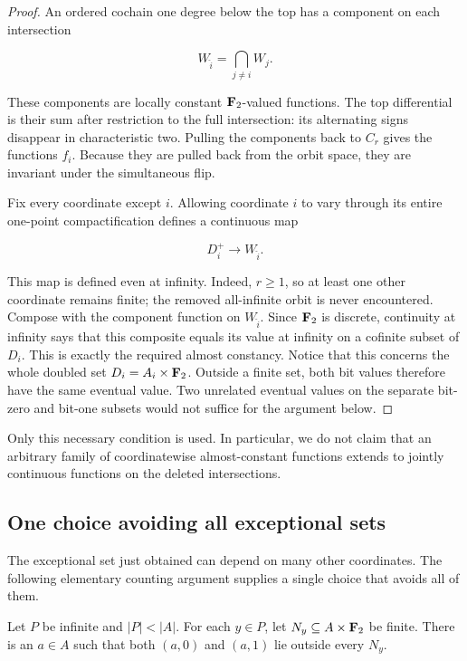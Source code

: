 \begin{proof}
An ordered cochain one degree below the top has a component on each
intersection

\[
W_{\widehat i}=\bigcap_{j\neq i}W_j.
\]

These components are locally constant \(\mathbf F_2\)-valued functions.
The top differential is their sum after restriction to the full
intersection: its alternating signs disappear in characteristic two.
Pulling the components back to \(C_r\) gives the functions \(f_i\).
Because they are pulled back from the orbit space, they are invariant
under the simultaneous flip.

Fix every coordinate except \(i\).  Allowing coordinate \(i\) to vary
through its entire one-point compactification defines a continuous map

\[
D_i^+\longrightarrow W_{\widehat i}.
\]

This map is defined even at infinity.  Indeed, \(r\geq1\), so at least one
other coordinate remains finite; the removed all-infinite orbit is never
encountered.  Compose with the component function on \(W_{\widehat i}\).
Since \(\mathbf F_2\) is discrete, continuity at infinity says that this composite
equals its value at infinity on a cofinite subset of \(D_i\).  This is
exactly the required almost constancy.  Notice that this concerns the
whole doubled set \(D_i=A_i\times\mathbf F_2\).  Outside a finite set, both bit
values therefore have the same eventual value.  Two unrelated eventual
values on the separate bit-zero and bit-one subsets would not suffice
for the argument below.
\end{proof}

Only this necessary condition is used.  In particular, we do not claim
that an arbitrary family of coordinatewise almost-constant functions
extends to jointly continuous functions on the deleted intersections.

\subsection{One choice avoiding all exceptional sets}

The exceptional set just obtained can depend on many other coordinates.
The following elementary counting argument supplies a single choice
that avoids all of them.

\begin{lemma}\label{lem:uniform-thinning}
Let \(P\) be infinite and \(|P|<|A|\).  For each \(y\in P\), let
\(N_y\subseteq A\times\mathbf F_2\) be finite.  There is an \(a\in A\) such that
both \((a,0)\) and \((a,1)\) lie outside every \(N_y\).
\end{lemma}


